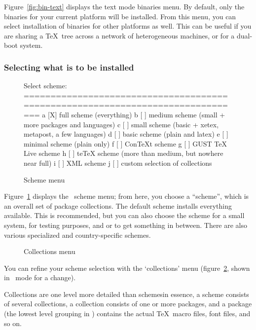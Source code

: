 \documentclass{article}
\begin{document}
Figure~\ref{fig:bin-text} displays the text mode binaries menu.  By
default, only the binaries for your current platform will be installed.
From this menu, you can select installation of binaries for other
platforms as well.  This can be useful if you are sharing a \TeX\
tree across a network of heterogeneous machines, or for a dual-boot
system.

\subsubsection{Selecting what is to be installed}
\label{sec:components}

\begin{figure}[tbh]
\begin{boxedverbatim}
Select scheme:
===============================================================================
 a [X] full scheme (everything)
 b [ ] medium scheme (small + more packages and languages)
 c [ ] small scheme (basic + xetex, metapost, a few languages)
 d [ ] basic scheme (plain and latex)
 e [ ] minimal scheme (plain only)
 f [ ] ConTeXt scheme
 g [ ] GUST TeX Live scheme
 h [ ] teTeX scheme (more than medium, but nowhere near full)
 i [ ] XML scheme
 j [ ] custom selection of collections
\end{boxedverbatim}
\caption{Scheme menu}\label{fig:scheme-text}
\end{figure}

Figure~\ref{fig:scheme-text} displays the \TL\ scheme menu; from here,
you choose a ``scheme'', which is an overall set of package collections.
The default \optname{full} scheme installs everything available.  This
is recommended, but you can also choose the \optname{basic} scheme for a
small system, \optname{minimal} for testing purposes, and
 or  to get something in between.  There
are also various specialized and country-specific schemes.

\begin{figure}[tb]
\centering {}
\caption{Collections menu}\label{fig:collections-gui}
\end{figure}

You can refine your scheme selection with the `collections' menu
(figure~\ref{fig:collections-gui}, shown in \GUI\ mode for a change).

Collections are one level more detailed than schemes\Dash in essence, a
scheme consists of several collections, a collection consists of one or
more packages, and a package (the lowest level grouping in \TL) contains
the actual \TeX\ macro files, font files, and so on.
\end{document}
